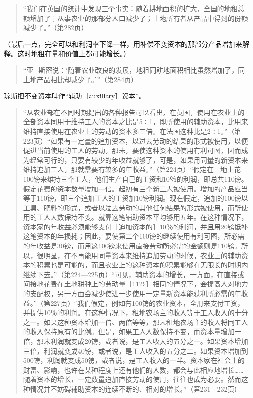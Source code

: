 \begin{quote}{“我们在英国的统计中发现三个事实：随着耕地面积的扩大，全国的地租总额增加了；从事农业的那部分人口减少了；土地所有者从产品中得到的份额减少了。”（第282页）}\end{quote}

（最后一点，完全可以和利润率下降一样，用补偿不变资本的那部分产品增加来解释。这时地租在量和价值上都可能增长。）

\begin{quote}{“亚·斯密说：‘随着农业改良的发展，地租同耕地面积相比虽然增加了，同土地产品相比却减少了。’”（第284页）}\end{quote}

琼斯把不变资本叫作“辅助［auxiliary］资本”。

\begin{quote}{“从农业部在不同时期提出的各种报告可以看出，在英国，使用在农业上的全部资本同用于维持工人的资本之比是5∶1，即所使用的辅助资本，比用来维持直接使用在农业上的劳动的资本多三倍。在法国这种比是2∶1。”（第223页）“如果有一定量的追加资本，以过去劳动的结果的形式被使用，以便促进当前使用的工人的劳动，那末，要使这种资本的使用有利可图，因而成为经常可行的，只要有较少的年收益就够了，可是，如果用同量的新资本来维持追加工人，那就需要有较多的年收益。”（第224页）“假定在土地上花100镑来维持三个工人，他们生产自己的工资和10％的利润，即总共110镑。假定花费的资本数量增加一倍。起初有三个新工人被使用。增加的产品应当等于110镑，即三个追加工人的工资加10镑利润。现在假定，追加的100镑以工具、肥料的形式，或者以过去劳动的其他任何结果的形式被使用，而所使用的工人人数保持不变。就算这笔辅助资本平均够用五年。在这种情况下，资本家的年收益必须能够支付［追加资本的］10％的利润，并且用20镑抵补这笔资本的年损耗；因此，要使第二个100镑的继续使用有利可图，所必需的年收益是30镑，而用这100镑来使用直接劳动所必需的金额则是110镑。所以，很明显，在不再能用同量资本来维持追加劳动的时候，农业上的辅助资本的积累也是可能的，而且农业上的这种资本的积累能够在无限长的时期内继续下去。”（第224—225页）“可见，辅助资本的增长，一方面，在直接或间接地花费在土地耕种上的劳动量［1129］相同的情况下，会提高人对地力的支配权，另一方面会减少使进一步使用一定量新资本能获利所必需的年收益。”（第227页）“我们假定，例如有100镑的农业资本，全用来支付工资，并提供10％的利润。在这种情况下，租地农场主的收入等于工人收入的十分之一。如果这种资本增加一倍、两倍等等，那末租地农场主的收入将同工人的收入保持原有的比例。但是，如果工人人数保持不变，而资本量增加一倍，那末利润就变成20镑，或者说，是工人收入的五分之一。如果资本增加三倍，利润就变成40镑，或者说，是工人收入的五分之二。如果资本增加到500镑，利润就变成50镑，或者说，是工人收入的一半。资本家在社会上的财富、影响，也许在某种程度上还有他们的人数，都会与此相应地增长……随着资本的增长，一定数量追加直接劳动的使用，往往也成为必要。然而这种情况并不妨碍辅助资本的连续不断的、相对的增长。”（第231—232页）}\end{quote}

